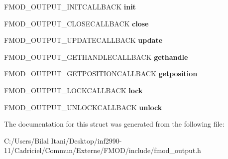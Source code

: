 \begin{DoxyCompactItemize}
\item 
F\+M\+O\+D\+\_\+\+O\+U\+T\+P\+U\+T\+\_\+\+I\+N\+I\+T\+C\+A\+L\+L\+B\+A\+CK {\bfseries init}\hypertarget{struct_f_m_o_d___o_u_t_p_u_t___d_e_s_c_r_i_p_t_i_o_n_a16015d5d334e75322b95adebaac20139}{}\label{struct_f_m_o_d___o_u_t_p_u_t___d_e_s_c_r_i_p_t_i_o_n_a16015d5d334e75322b95adebaac20139}

\item 
F\+M\+O\+D\+\_\+\+O\+U\+T\+P\+U\+T\+\_\+\+C\+L\+O\+S\+E\+C\+A\+L\+L\+B\+A\+CK {\bfseries close}\hypertarget{struct_f_m_o_d___o_u_t_p_u_t___d_e_s_c_r_i_p_t_i_o_n_a5e0e9b99b7b8011bb248e58ad82b4fa8}{}\label{struct_f_m_o_d___o_u_t_p_u_t___d_e_s_c_r_i_p_t_i_o_n_a5e0e9b99b7b8011bb248e58ad82b4fa8}

\item 
F\+M\+O\+D\+\_\+\+O\+U\+T\+P\+U\+T\+\_\+\+U\+P\+D\+A\+T\+E\+C\+A\+L\+L\+B\+A\+CK {\bfseries update}\hypertarget{struct_f_m_o_d___o_u_t_p_u_t___d_e_s_c_r_i_p_t_i_o_n_a3c61df7f0da61edd058317a0966c04bf}{}\label{struct_f_m_o_d___o_u_t_p_u_t___d_e_s_c_r_i_p_t_i_o_n_a3c61df7f0da61edd058317a0966c04bf}

\item 
F\+M\+O\+D\+\_\+\+O\+U\+T\+P\+U\+T\+\_\+\+G\+E\+T\+H\+A\+N\+D\+L\+E\+C\+A\+L\+L\+B\+A\+CK {\bfseries gethandle}\hypertarget{struct_f_m_o_d___o_u_t_p_u_t___d_e_s_c_r_i_p_t_i_o_n_a2029938a3daf763ac99e971bf0a4ce40}{}\label{struct_f_m_o_d___o_u_t_p_u_t___d_e_s_c_r_i_p_t_i_o_n_a2029938a3daf763ac99e971bf0a4ce40}

\item 
F\+M\+O\+D\+\_\+\+O\+U\+T\+P\+U\+T\+\_\+\+G\+E\+T\+P\+O\+S\+I\+T\+I\+O\+N\+C\+A\+L\+L\+B\+A\+CK {\bfseries getposition}\hypertarget{struct_f_m_o_d___o_u_t_p_u_t___d_e_s_c_r_i_p_t_i_o_n_ae8b8332e832ea9d12c45a48dd0481e9e}{}\label{struct_f_m_o_d___o_u_t_p_u_t___d_e_s_c_r_i_p_t_i_o_n_ae8b8332e832ea9d12c45a48dd0481e9e}

\item 
F\+M\+O\+D\+\_\+\+O\+U\+T\+P\+U\+T\+\_\+\+L\+O\+C\+K\+C\+A\+L\+L\+B\+A\+CK {\bfseries lock}\hypertarget{struct_f_m_o_d___o_u_t_p_u_t___d_e_s_c_r_i_p_t_i_o_n_a906c1cdb6636db105538db27b48cc513}{}\label{struct_f_m_o_d___o_u_t_p_u_t___d_e_s_c_r_i_p_t_i_o_n_a906c1cdb6636db105538db27b48cc513}

\item 
F\+M\+O\+D\+\_\+\+O\+U\+T\+P\+U\+T\+\_\+\+U\+N\+L\+O\+C\+K\+C\+A\+L\+L\+B\+A\+CK {\bfseries unlock}\hypertarget{struct_f_m_o_d___o_u_t_p_u_t___d_e_s_c_r_i_p_t_i_o_n_adeb7eea407c7b5b167d0cd30c6ef4a9f}{}\label{struct_f_m_o_d___o_u_t_p_u_t___d_e_s_c_r_i_p_t_i_o_n_adeb7eea407c7b5b167d0cd30c6ef4a9f}

\end{DoxyCompactItemize}


The documentation for this struct was generated from the following file\+:\begin{DoxyCompactItemize}
\item 
C\+:/\+Users/\+Bilal Itani/\+Desktop/inf2990-\/11/\+Cadriciel/\+Commun/\+Externe/\+F\+M\+O\+D/include/fmod\+\_\+output.\+h\end{DoxyCompactItemize}
